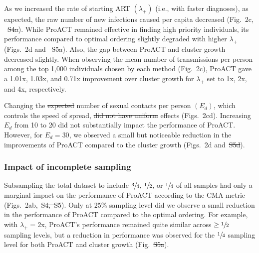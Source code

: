 \documentclass[a4paper,11pt]{article}
\newcommand{\PLWH}{sample\xspace}
\providecommand{\DIFadd}[1]{{\protect\color{blue}\uwave{#1}}} %
\providecommand{\DIFdel}[1]{{\protect\color{red}\sout{#1}}}                      %
\providecommand{\DIFaddbegin}{} %
\providecommand{\DIFaddend}{} %
\providecommand{\DIFdelbegin}{} %
\providecommand{\DIFdelend}{} %
\begin{document}
As we increased the rate of starting ART $\left(\lambda_{+}\right)$ (i.e., with faster diagnoses), as expected, the raw number of new infections caused per capita  decreased (Fig.~2c, ~\DIFdelbegin \DIFdel{S4a}\DIFdelend \DIFaddbegin \DIFadd{S5}\DIFaddend ).
While ProACT remained effective in finding high priority individuals,
its performance compared to optimal ordering slightly degraded with higher $\lambda_{+}$ (Figs.~2d and ~\DIFdelbegin \DIFdel{S5a}\DIFdelend \DIFaddbegin \DIFadd{S7}\DIFaddend ).
Also, the gap between ProACT and cluster growth decreased slightly.
When observing the mean number of transmissions per person among the top 1,000 individuals chosen by each method (Fig.~2c),
ProACT gave a 1.01x, 1.03x, and 0.71x improvement over cluster growth for $\lambda_{+}$ set to 1x, 2x, and 4x, respectively.


Changing the \DIFdelbegin \DIFdel{expected }\DIFdelend number of sexual contacts per person $\left(E_d\right)$, which controls the speed of spread, \DIFdelbegin \DIFdel{did not have uniform }\DIFdelend \DIFaddbegin \DIFadd{had nonuniform }\DIFaddend effects (Figs.~2cd). 
Increasing $E_d$ from 10 to 20 did not substantially impact the performance of ProACT. However, for $E_d=30$, we observed a small but noticeable reduction in the improvements of ProACT compared to the cluster growth (Figs.~2d and~\DIFdelbegin \DIFdel{S5d}\DIFdelend \DIFaddbegin \DIFadd{S7}\DIFaddend ).




\subsubsection{Impact of incomplete sampling}
Subsampling the total dataset to include $\sfrac{3}{4}$, $\sfrac{1}{2}$, or $\sfrac{1}{4}$ of all \PLWH{s} had only a marginal impact on the performance of ProACT according to the CMA metric  (Figs.~2ab,~\DIFdelbegin \DIFdel{S4,~S5}\DIFdelend \DIFaddbegin \DIFadd{S8,~S9}\DIFaddend ). 
Only at 25\% sampling level did we observe a small reduction in the performance of ProACT compared to the optimal ordering. 
For example, 
with $\lambda_{+}=2$x, ProACT's performance remained quite similar across $\geq \sfrac{1}{2}$ sampling levels, but a reduction in performance was observed for the $\sfrac{1}{4}$ sampling level for both ProACT and  cluster growth  (Fig.~\DIFdelbegin \DIFdel{S5a}\DIFdelend \DIFaddbegin \DIFadd{S7}\DIFaddend ).
\end{document}
